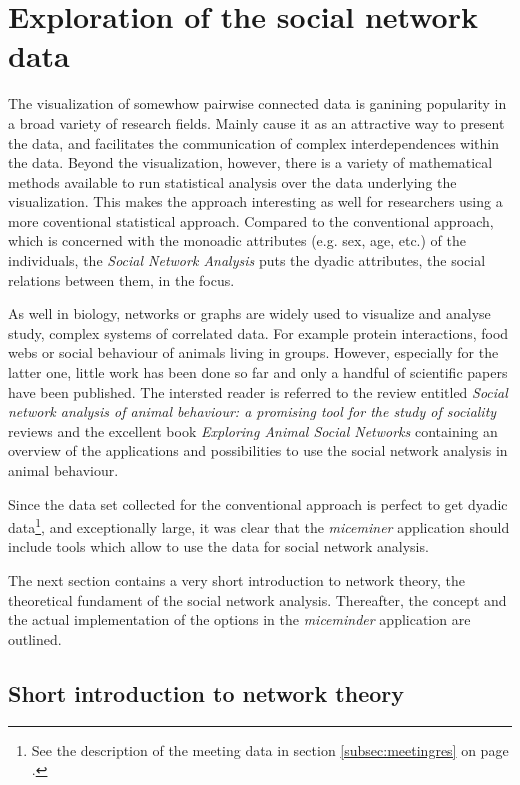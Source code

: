 \section{Exploration of the social network data}
\label{sec:graph}

The visualization of somewhow pairwise connected data is ganining popularity in a broad variety of research fields. Mainly cause it as an attractive way to present the data, and facilitates the communication of complex interdependences within the data. Beyond the visualization, however, there is a variety of mathematical methods available to run statistical analysis over the data underlying the visualization. This makes the approach interesting as well for researchers using a more coventional statistical approach. Compared to the conventional approach, which is concerned with the monoadic attributes (e.g. sex, age, etc.) of the individuals, the \textit{Social Network Analysis} puts the dyadic attributes, the social relations between them, in the focus.

As well in biology, networks or graphs are widely used to visualize and analyse study, complex systems of correlated data. For example protein interactions, food webs or social behaviour of animals living in groups. However, especially for the latter one, little work has been done so far and only a handful of scientific papers have been published. The intersted reader is referred to the review entitled \textit{Social network analysis of animal behaviour: a promising 
tool for the study of sociality}\cite{wey:08} reviews and the excellent book \textit{Exploring Animal Social Networks}\cite{croft:07} containing an overview of the applications and possibilities to use the social network analysis in animal behaviour.

Since the data set collected for the conventional approach is perfect to get dyadic data\footnote{See the description of the meeting data in section \ref{subsec:meetingres} on page \pageref{subsec:meetingres}.}, and exceptionally large, it was clear that the \textit{miceminer} application should include tools which allow to use the data for social network analysis.

The next section contains a very short introduction to network theory, the theoretical fundament of the social network analysis. Thereafter, the concept and the actual implementation of the options in the \textit{miceminder} application are outlined.  

\subsection{Short introduction to network theory}
\label{subsec:graph_intro}


